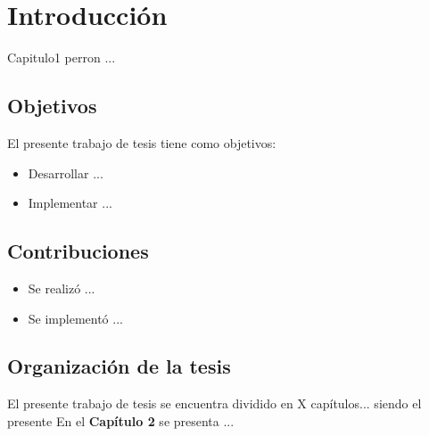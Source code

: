 \chapter{Introducción}\label{Cap1}\graphicspath{{05-Capitulos/01/Figuras/}}
 Capitulo1 perron ...
 \cite{spong1989}
\cite{kelly2005}



\section{Objetivos}
El presente trabajo de tesis tiene como objetivos:
\begin{itemize}
  \item Desarrollar ... 
  \item Implementar ...
\end{itemize}


\section{Contribuciones}
\begin{itemize}
 \item Se realizó ... 
 \item Se implementó ... 
\end{itemize}


\section{Organización de la tesis}
El presente trabajo de tesis se encuentra dividido en X capítulos... siendo el presente 
En el \textbf{Capítulo 2} se presenta ... \\


